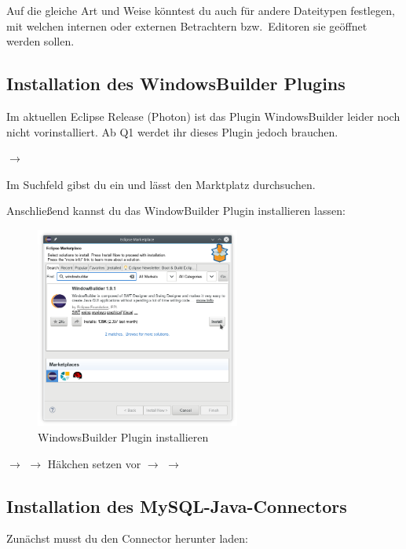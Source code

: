 Auf die gleiche Art und Weise könntest du auch für andere Dateitypen festlegen,
mit welchen internen oder externen Betrachtern bzw.\ Editoren sie geöffnet
werden sollen.


\subsection{Installation des WindowsBuilder Plugins}

Im aktuellen Eclipse Release (Photon) ist das Plugin WindowsBuilder leider noch
nicht vorinstalliert. Ab Q1 werdet ihr dieses Plugin jedoch brauchen.

 $\rightarrow$ 

Im Suchfeld gibst du  ein und lässt den Marktplatz
durchsuchen.

Anschließend kannst du das WindowBuilder Plugin installieren lassen:

\begin{figure}
  \centering
   \includegraphics[width=0.6\textwidth]{./inf/SEKII/01_Vorbereitung/windowbuilder_plugin.png}
   \caption{WindowsBuilder Plugin installieren}
   \label{fig:windowbuilder-plugin}
\end{figure}

$\rightarrow$  $\rightarrow$ Häkchen setzen vor
 $\rightarrow$  $\rightarrow$


\subsection{Installation des
MySQL-Java-Connectors}\label{mysql-connector-installation}

Zunächst musst du den Connector herunter laden:


